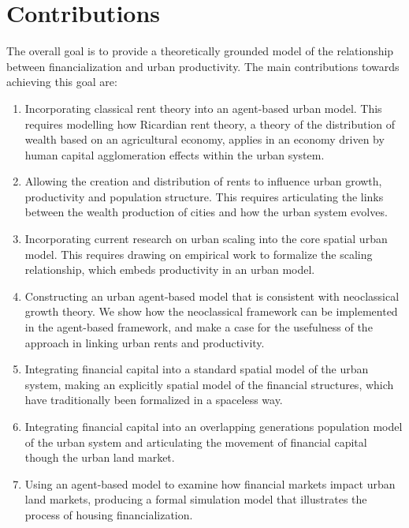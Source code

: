 \section{Contributions}
The overall goal is to provide a theoretically grounded model of the relationship between financialization and urban productivity. The main contributions towards achieving this goal are:
\begin{enumerate}
    \item  Incorporating \gls{classical rent theory} into an \gls{agent-based} urban model. This requires modelling how \gls{Ricardian rent theory}, a theory of the distribution of wealth based on an agricultural economy, applies in an economy driven by human capital \gls{agglomeration} effects within the urban system. 

    \item Allowing the creation and distribution of rents to influence urban growth, productivity and population structure. This requires articulating the links between the wealth production of cities and how the urban system evolves.

    \item Incorporating current research on \gls{urban scaling} into the core spatial urban model.  This requires drawing on empirical work to formalize the scaling relationship, which embeds productivity in an urban model. 

    \item Constructing an urban \gls{agent-based model} that is consistent with {neoclassical growth theory}. We show how the neoclassical framework can be implemented in the agent-based framework, and make a case for the usefulness of the approach in linking urban rents and productivity. 

    \item Integrating \gls{financial capital} into a standard spatial model of the urban system, making an explicitly spatial model of the financial structures, which have traditionally been formalized in a spaceless way.
    
    \item Integrating financial capital into an \gls{overlapping generations} population model of the urban system and articulating the movement of financial capital though the urban land market. 
    
    \item Using an agent-based model to examine how financial markets impact urban \glspl{land market}, producing a formal simulation model that illustrates the process of housing financialization. 


\end{enumerate}
